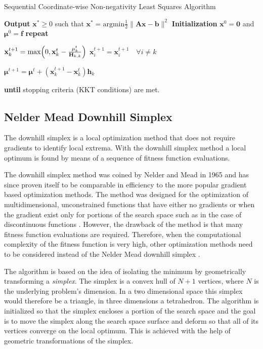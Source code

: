 \documentclass[11pt,a4paper]{report}
\begin{document}
\begin{algorithm}\label{a:sca}
\caption{Sequential Coordinate-wise Non-negativity Least Squares Algorithm}
\begin{algorithmic}[1]
\State \textbf{Output} $\mathbf{x^*} \ge 0$ such that $\mathbf{x^*} =
\mathrm{argmin} \frac{1}{2}\lVert \mathbf{Ax - b} \rVert^2$
\State \textbf{Initialization} $\mathbf{x}^0 = \mathbf{0}$ and $\mathbf{\mu}^0 =
\mathbf{f}$
\State \textbf{repeat}

\State $\mathbf{x}_k^{t+1} = \mathrm{max} \Bigr(0,\mathbf{x}_k^t -
\frac{\mathbf{\mu}_k^t}{\mathbf{H}_{k,k}} \Bigl)$
\State $ \mathbf{x}_i^{t+1} = \mathbf{x}_i^{t+1} \quad \forall i \ne k$

\State $\mathbf{\mu}^{t+1} = \mathbf{\mu}^t + (\mathbf{x}_k^{t+1} - \mathbf{x}_k^t)\mathbf{h}_k$

\EndFor

\State \textbf{until} stopping criteria (KKT conditions) are met.
\EndProcedure
\end{algorithmic}
\end{algorithm}



\subsection{Nelder Mead Downhill Simplex}\label{s:nelder}

The downhill simplex is a local optimization method that does not
require gradients to identify local extrema. With the downhill simplex method a
local optimum is found by means of a sequence of fitness function evaluations.

The downhill simplex method was coined by Nelder and Mead in 1965
and has since proven itself to be comparable in efficiency to the more popular 
gradient based optimization methods. The method was designed
for the optimization of multidimensional, unconstrained functions
that have either no gradients or when the gradient exist only for
portions of the search space such as in the case of discontinuous functions
\cite{Nelder2009}. However, the drawback of the method is that many fitness function evaluations
are required. Therefore, when the computational complexity of the
fitness function is very high, other optimization methods need to
be considered instead of the Nelder Mead downhill simplex \cite{Press1992}.

The algorithm is based on the idea of isolating the
minimum by geometrically transforming a \textit{simplex}. The simplex
is a convex hull of $N+1$ vertices, where $N$ is the underlying
problem's dimension. In a two dimensional space this simplex would therefore
be a triangle, in three dimensions a tetrahedron. The algorithm is initialized
so that the simplex encloses
a portion of the search space and the goal is to move the simplex along the
search space surface and deform so that all of its vertices converge on the local optimum. This is achieved with
the help of geometric transformations of the simplex.
\end{document}
